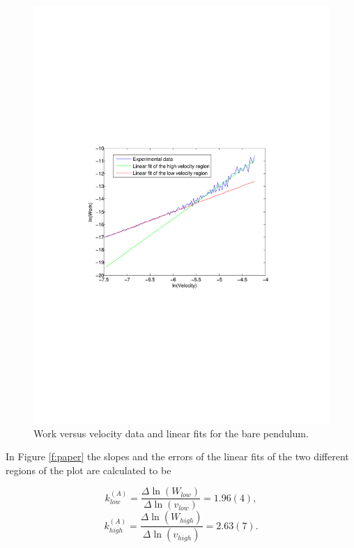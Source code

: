 \documentclass[11pt, a4paper]{article}
\begin{document}
\begin{figure}[h!]
	\centering
	\includegraphics[trim=10.0cm 10.0cm 10.0cm 10.0cm, scale=0.7]{no_paper}
	\caption{Work versus velocity data and  linear fits for the bare pendulum.}
	\label{f:nopaper}
\end{figure}

In Figure \ref{f:paper} the slopes and the errors of the linear fits of the two different regions of the plot are calculated to be

\[
	k_{low}^{(A)} = \frac{\Delta\ln(W_{low})}{\Delta\ln(v_{low})} = 1.96(4),
\]\[
	k_{high}^{(A)} = \frac{\Delta\ln(W_{high})}{\Delta\ln(v_{high})} = 2.63(7).
\]
\end{document}
